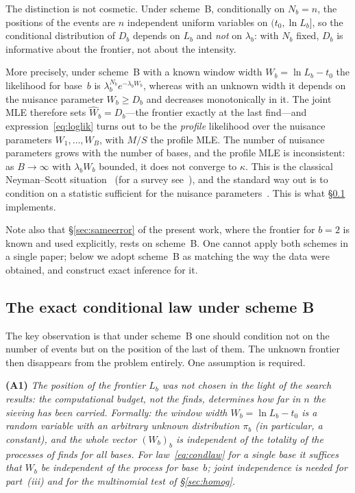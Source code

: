 \documentclass[11pt,a4paper]{article}
\theoremstyle{plain}
\theoremstyle{remark}
\begin{document}
The distinction is not cosmetic. Under scheme~B, conditionally on $N_b=n$, the
positions of the events are $n$ independent uniform variables on
$(t_0,\ln L_b]$, so the conditional distribution of $D_b$ depends on $L_b$ and
\emph{not} on $\lambda_b$: with $N_b$ fixed, $D_b$ is informative about the
frontier, not about the intensity.

More precisely, under scheme~B with a known window width $W_b=\ln L_b-t_0$ the
likelihood for base~$b$ is $\lambda_b^{N_b}e^{-\lambda_bW_b}$, whereas with an
unknown width it depends on the nuisance parameter $W_b\ge D_b$ and decreases
monotonically in it. The joint MLE therefore sets $\hat W_b=D_b$---the frontier
exactly at the last find---and expression~\eqref{eq:loglik} turns out to be the
\emph{profile} likelihood over the nuisance parameters $W_1,\dots,W_B$, with
$M/S$ the profile MLE. The number of nuisance parameters grows with the number
of bases, and the profile MLE is inconsistent: as $B\to\infty$ with
$\lambda_bW_b$ bounded, it does not converge to $\kappa$. This is the classical
Neyman--Scott situation~\cite{neymanscott1948} (for a survey
see~\cite{lancaster2000}), and the standard way out is to condition on a
statistic sufficient for the nuisance
parameters~\cite{kalbfleischsprott1970,andersen1970}. This is what
\S\ref{sec:exact} implements.

Note also that \S\ref{sec:sameerror} of the present work, where the frontier for
$b=2$ is known and used explicitly, rests on scheme~B. One cannot apply both
schemes in a single paper; below we adopt scheme~B as matching the way the data
were obtained, and construct exact inference for it.

\subsection{The exact conditional law under scheme B}\label{sec:exact}

The key observation is that under scheme~B one should condition not on the
number of events but on the position of the last of them. The unknown frontier
then disappears from the problem entirely. One assumption is required.

\medskip
\noindent\textbf{(A1)} \emph{The position of the frontier $L_b$ was not chosen in
the light of the search results: the computational budget, not the finds,
determines how far in $n$ the sieving has been carried. Formally: the window
width $W_b=\ln L_b-t_0$ is a random variable with an arbitrary unknown
distribution $\pi_b$ (in particular, a constant), and the whole vector
$(W_b)_b$ is independent of the totality of the processes of finds for all
bases. For law~\eqref{eq:condlaw} for a single base it suffices that $W_b$ be
independent of the process for base~$b$; joint independence is needed for
part~(iii) and for the multinomial test of \S\ref{sec:homog}.}
\end{document}

